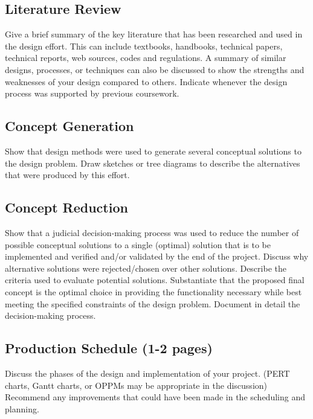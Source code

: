 \documentclass[12pt]{article}
\begin{document}
\subsection{Literature Review}
Give a brief summary of the key literature that has been researched and used in the design effort. This can include textbooks, handbooks, technical papers, technical reports, web sources, codes and regulations. A summary of similar designs, processes, or techniques can also be discussed to show the strengths and weaknesses of your design compared to others. Indicate whenever the design process was supported by previous coursework.

\subsection{Concept Generation}
Show that design methods were used to generate several conceptual solutions to the design problem. Draw sketches or tree diagrams to describe the alternatives that were produced by this effort.

\subsection{Concept Reduction}
Show that a judicial decision-making process was used to reduce the number of possible conceptual solutions to a single (optimal) solution that is to be implemented and verified and/or validated by the end of the project. Discuss why alternative solutions were rejected/chosen over other solutions. Describe the criteria used to evaluate potential solutions. Substantiate that the proposed final concept is the optimal choice in providing the functionality necessary while best meeting the specified constraints of the design problem. Document in detail the decision-making process.

\subsection{Production Schedule (1-2 pages)}
Discuss the phases of the design and implementation of your project. (PERT charts, Gantt charts, or OPPMs may be appropriate in the discussion) Recommend any improvements that could have been made in the scheduling and planning.

\end{document}
